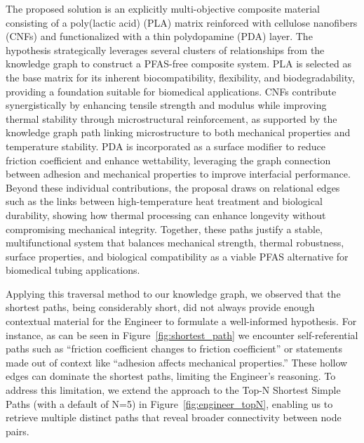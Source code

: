 The proposed solution is an explicitly multi-objective composite material consisting of a poly(lactic acid) (PLA) matrix reinforced with cellulose nanofibers (CNFs) and functionalized with a thin polydopamine (PDA) layer. The hypothesis strategically leverages several clusters of relationships from the knowledge graph to construct a PFAS-free composite system. PLA is selected as the base matrix for its inherent biocompatibility, flexibility, and biodegradability, providing a foundation suitable for biomedical applications. CNFs contribute synergistically by enhancing tensile strength and modulus while improving thermal stability through microstructural reinforcement, as supported by the knowledge graph path linking microstructure to both mechanical properties and temperature stability. PDA is incorporated as a surface modifier to reduce friction coefficient and enhance wettability, leveraging the graph connection between adhesion and mechanical properties to improve interfacial performance. Beyond these individual contributions, the proposal draws on relational edges such as the links between high-temperature heat treatment and biological durability, showing how thermal processing can enhance longevity without compromising mechanical integrity. Together, these paths justify a stable, multifunctional system that balances mechanical strength, thermal robustness, surface properties, and biological compatibility as a viable PFAS alternative for biomedical tubing applications. 

Applying this traversal method to our knowledge graph, we observed that the shortest paths, being considerably short, did not always provide enough contextual material for the Engineer to formulate a well-informed hypothesis. For instance, as can be seen in Figure~\ref{fig:shortest_path} we encounter self-referential paths such as “friction coefficient changes to friction coefficient” or statements made out of context like “adhesion affects mechanical properties.” These hollow edges can dominate the shortest paths, limiting the Engineer’s reasoning. To address this limitation, we extend the approach to the Top-N Shortest Simple Paths (with a default of N=5) in Figure~\ref{fig:engineer_topN}, enabling us to retrieve multiple distinct paths that reveal broader connectivity between node pairs. 

